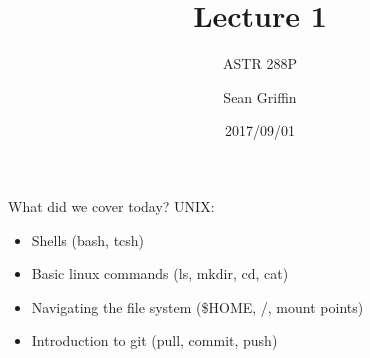 \documentclass[10pt]{beamer}
\title{Lecture 1}
\subtitle{ASTR 288P}
\date{2017/09/01}
\author{Sean Griffin}
\institute{UMCP / NASA GSFC}
\begin{document}
\maketitle


\begin{frame}[fragile]{What did we cover today?}
UNIX:
	\begin{itemize}
        \item Shells (bash, tcsh)
        \item Basic linux commands (ls, mkdir, cd, cat)
        \item Navigating the file system (\$HOME, /, mount points)
        \item Introduction to git (pull, commit, push)
	\end{itemize}
\end{frame}
\end{document}
